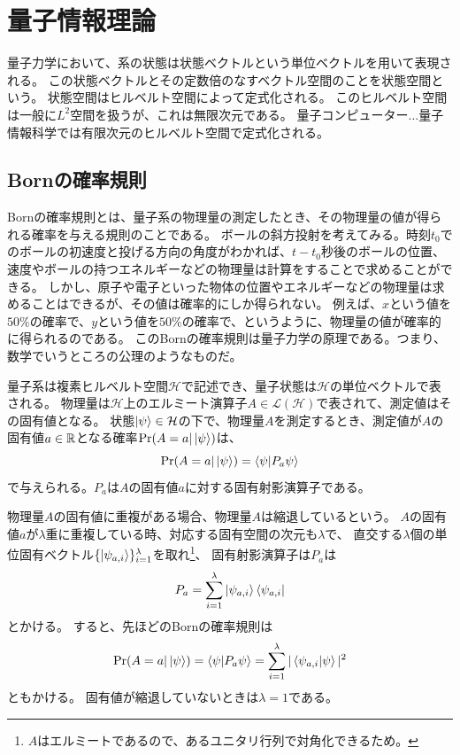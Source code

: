 \section{量子情報理論}
量子力学において、系の状態は状態ベクトルという単位ベクトルを用いて表現される。
この状態ベクトルとその定数倍のなすベクトル空間のことを状態空間という。
状態空間はヒルベルト空間によって定式化される。
このヒルベルト空間は一般に$L^2$空間を扱うが、これは無限次元である。
量子コンピューター$\ldots$量子情報科学では有限次元のヒルベルト空間で定式化される。

\subsection{Bornの確率規則}
Bornの確率規則とは、量子系の物理量の測定したとき、その物理量の値が得られる確率を与える規則のことである。
ボールの斜方投射を考えてみる。時刻$t_0$でのボールの初速度と投げる方向の角度がわかれば、$t-t_0$秒後のボールの位置、
速度やボールの持つエネルギーなどの物理量は計算をすることで求めることができる。
しかし、原子や電子といった物体の位置やエネルギーなどの物理量は求めることはできるが、その値は確率的にしか得られない。
例えば、$x$という値を$50\%$の確率で、$y$という値を$50\%$の確率で、というように、物理量の値が確率的に得られるのである。
このBornの確率規則は量子力学の原理である。つまり、数学でいうところの公理のようなものだ。
\begin{Axiom}
  量子系は複素ヒルベルト空間$\mathcal{H}$で記述でき、量子状態は$\mathcal{H}$の単位ベクトルで表される。
  物理量は$\mathcal{H}$上のエルミート演算子$A\in\mathcal{L}(\mathcal{H})$で表されて、測定値はその固有値となる。
  状態$\ket{\psi}\in\mathcal{H}$の下で、物理量$A$を測定するとき、測定値が$A$の固有値$a\in\mathbb{R}$となる確率$\Pr(A=a | \ket{\psi})$は、
  $$
  \Pr(A=a|\ket{\psi}) = \braket{\psi|P_a\psi}
  $$
  で与えられる。$P_a$は$A$の固有値$a$に対する固有射影演算子である。
\end{Axiom}

物理量$A$の固有値に重複がある場合、物理量$A$は縮退しているという。
$A$の固有値$a$が$\lambda$重に重複している時、対応する固有空間の次元も$\lambda$で、
直交する$\lambda$個の単位固有ベクトル$\{\ket{\psi_{a,i}}\}_{i=1}^\lambda$を取れ\footnote{$A$はエルミートであるので、あるユニタリ行列で対角化できるため。}、
固有射影演算子は$P_a$は
\begin{equation}
  P_a = \sum_{i=1}^\lambda \ket{\psi_{a,i}}\bra{\psi_{a,i}}
\end{equation}
とかける。
すると、先ほどのBornの確率規則は
\begin{align}
  \Pr(A=a|\ket{\psi}) = \braket{\psi|P_a\psi} = \sum_{i=1}^\lambda |\braket{\psi_{a,i}|\psi}|^2
\end{align}
ともかける。
固有値が縮退していないときは$\lambda = 1$である。

